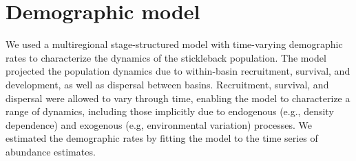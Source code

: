
\section*{Demographic model} \label{model}


We used a multiregional stage-structured model with time-varying demographic rates
to characterize the dynamics of the stickleback population. 
The model projected the population dynamics due to 
within-basin recruitment, survival, and development, 
as well as dispersal between basins. 
Recruitment, survival, and dispersal were allowed to vary through time,
enabling the model to characterize a range of dynamics, 
including those implicitly due to endogenous (e.g., density dependence) 
and exogenous (e.g, environmental variation) processes. 
We estimated the demographic rates by  
fitting the model to the time series of abundance estimates. 

